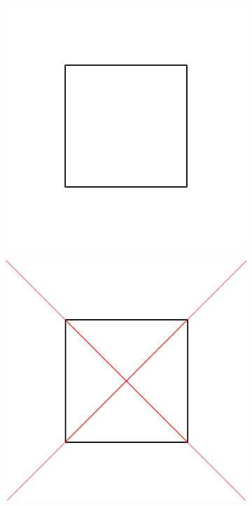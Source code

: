 \documentclass[11pt]{article}
\begin{document}
\begin{figure}[H]
\centering
  \begin{subfigure}[b]{0.18\textwidth}
    \includegraphics[width=\textwidth]{FIGS/Part4/s20}
     \caption{}
    \label{fig:s20}
  \end{subfigure}
  \begin{subfigure}[b]{0.18\textwidth}
    \includegraphics[width=\textwidth]{FIGS/Part4/s21}

\end{subfigure}
\end{figure}
\end{document}
